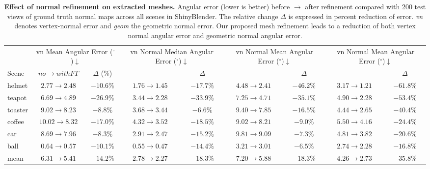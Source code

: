 \begin{table}[t]
\centering
\small
\setlength{\tabcolsep}{4pt}
\caption{\textbf{Effect of normal refinement on extracted meshes.}
Angular error (lower is better) before $\rightarrow$ after refinement compared with 200 test views of ground truth normal maps across all scenes in ShinyBlender.
The relative change $\Delta$ is expressed in percent reduction of error. \emph{vn} denotes vertex-normal error
and \emph{geom} the geometric normal error. Our proposed mesh refinement leads to a reduction of both vertex normal angular error and geometric normal angular error.}
\label{tab:normal_refinement}

\begin{tabular}{l cc cc cc cc}
\toprule
& \multicolumn{2}{c}{vn Mean Angular Error ($^\circ$)$\downarrow$}
& \multicolumn{2}{c}{vn Normal Median Angular Error ($^\circ$)$\downarrow$}
& \multicolumn{2}{c}{vn Normal Mean Angular Error ($^\circ$)$\downarrow$}
& \multicolumn{2}{c}{vn Normal Mean Angular Error ($^\circ$)$\downarrow$} \\
\cmidrule(lr){2-3} \cmidrule(lr){4-5} \cmidrule(lr){6-7} \cmidrule(lr){8-9}
Scene & $no \rightarrow  with FT$& $\Delta$ (\%) & & $\Delta$ & & $\Delta$ & & $\Delta$ \\
\midrule
helmet  & $2.77 \rightarrow 2.48$  & $-10.6\%$ & $1.76 \rightarrow 1.45$ & $-17.7\%$ & $4.48 \rightarrow 2.41$ & $-46.2\%$ & $3.17 \rightarrow 1.21$ & $-61.8\%$ \\
teapot  & $6.69 \rightarrow 4.89$  & $-26.9\%$ & $3.44 \rightarrow 2.28$ & $-33.9\%$ & $7.25 \rightarrow 4.71$ & $-35.1\%$ & $4.90 \rightarrow 2.28$ & $-53.4\%$ \\
toaster & $9.02 \rightarrow 8.23$  & $-8.8\%$  & $3.68 \rightarrow 3.44$ & $-6.6\%$  & $9.40 \rightarrow 7.85$ & $-16.5\%$ & $4.44 \rightarrow 2.65$ & $-40.4\%$ \\
coffee  & $10.02 \rightarrow 8.32$ & $-17.0\%$ & $4.32 \rightarrow 3.52$ & $-18.5\%$ & $9.02 \rightarrow 8.21$ & $-9.0\%$  & $5.50 \rightarrow 4.16$ & $-24.4\%$ \\
car     & $8.69 \rightarrow 7.96$  & $-8.3\%$  & $2.91 \rightarrow 2.47$ & $-15.2\%$ & $9.81 \rightarrow 9.09$ & $-7.3\%$  & $4.81 \rightarrow 3.82$ & $-20.6\%$ \\
ball    & $0.64 \rightarrow 0.57$  & $-10.1\%$ & $0.55 \rightarrow 0.47$ & $-14.4\%$ & $3.21 \rightarrow 3.01$ & $-6.5\%$  & $2.74 \rightarrow 2.28$ & $-16.8\%$ \\
\midrule
mean    & $6.31 \rightarrow 5.41$  & $-14.2\%$ & $2.78 \rightarrow 2.27$ & $-18.3\%$ & $7.20 \rightarrow 5.88$ & $-18.3\%$ & $4.26 \rightarrow 2.73$ & $-35.8\%$ \\
\bottomrule
\end{tabular}
\end{table}